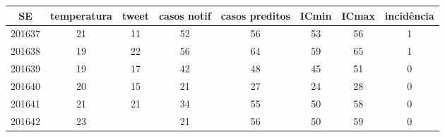 \begin{tabular}{c|ccccccc}
  \hline
SE & temperatura & tweet & casos notif & casos preditos & ICmin & ICmax & incidência \\ 
  \hline
201637 & 21 & 11 & 52 & 56 & 53 & 56 & 1 \\ 
  201638 & 19 & 22 & 56 & 64 & 59 & 65 & 1 \\ 
  201639 & 19 & 17 & 42 & 48 & 45 & 51 & 0 \\ 
  201640 & 20 & 15 & 21 & 27 & 24 & 28 & 0 \\ 
  201641 & 21 & 21 & 34 & 55 & 50 & 58 & 0 \\ 
  201642 & 23 &  & 21 & 56 & 50 & 59 & 0 \\ 
   \hline
\end{tabular}
